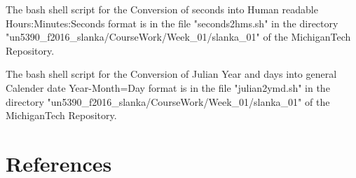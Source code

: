 \documentclass[fleqn,letterpaper,12pt]{report}
\begin{document}
\vfill

%
\newpage
{}
{}
\problem
The bash shell script for the Conversion of seconds into Human readable 
Hours:Minutes:Seconds format is in the file "seconds2hms.sh" in the directory "un5390\_f2016\_slanka/CourseWork/Week\_01/slanka\_01" of the MichiganTech Repository.\cite{tc}
\vfill
\newpage

%
\newpage
{}
{}
\problem
The bash shell script for the Conversion of Julian Year and days into general Calender date 
Year-Month=Day format is in the file "julian2ymd.sh" in the directory "un5390\_f2016\_slanka/CourseWork/Week\_01/slanka\_01" of the MichiganTech Repository.\cite{tc}
\vfill
\newpage
{}
\section*{References}


\end{document}
